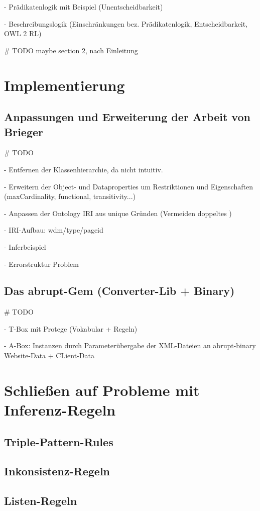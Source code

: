 \documentclass[runningheads,a4paper]{llncs}
\begin{document}
- Prädikatenlogik mit Beispiel (Unentscheidbarkeit)

- Beschreibungslogik (Einschränkungen bez. Prädikatenlogik, Entscheidbarkeit, OWL 2 RL)

\# TODO maybe section 2, nach Einleitung
\section{Implementierung}

\subsection{Anpassungen und Erweiterung der Arbeit von Brieger}
\# TODO

- Entfernen der Klassenhierarchie, da nicht intuitiv.

- Erweitern der Object- und Dataproperties um Restriktionen und Eigenschaften (maxCardinality, functional, transitivity...)

- Anpassen der Ontology IRI aus unique Gründen (Vermeiden doppeltes )

- IRI-Aufbau: {wdm}/{type}/{page}{id}

- Inferbeispiel

- Errorstruktur
Problem
\subsection{Das abrupt-Gem (Converter-Lib + Binary)}
\# TODO

- T-Box mit Protege (Vokabular + Regeln)

- A-Box: Instanzen durch Parameterübergabe der XML-Dateien an abrupt-binary Website-Data + CLient-Data

\newpage

\section{Schließen auf Probleme mit Inferenz-Regeln}
\subsection{Triple-Pattern-Rules}
\subsection{Inkonsistenz-Regeln}
\subsection{Listen-Regeln}
\end{document}

